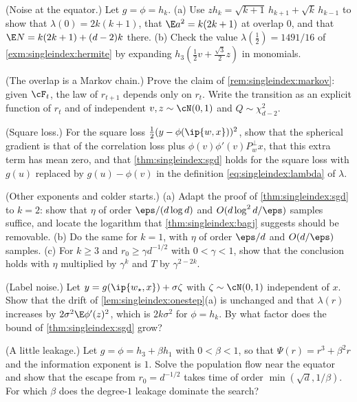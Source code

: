 \begin{refsection}
\begin{exercises}
\item \consolidation (Noise at the equator.) Let $g=\phi=h_k$. (a) Use $zh_k=\sqrt{k+1}\,h_{k+1}+\sqrt k\,h_{k-1}$ to show that $\lambda(0)=2k(k+1)$, that $\E a^2=k(2k+1)$ at overlap $0$, and that $\E N=k(2k+1)+(d-2)k$ there. (b) Check the value $\lambda(\frac12)=1491/16$ of \cref{exm:singleindex:hermite} by expanding $h_3(\frac12v+\frac{\sqrt3}2z)$ in monomials.\label{ex:singleindex:constants}

\item \consolidation (The overlap is a Markov chain.) Prove the claim of \cref{rem:singleindex:markov}: given $\cF_t$, the law of $r_{t+1}$ depends only on $r_t$. Write the transition as an explicit function of $r_t$ and of independent $v,z\sim\cN(0,1)$ and $Q\sim\chi^2_{d-2}$.\label{ex:singleindex:markov}

\item \consolidation (Square loss.) For the square loss $\frac12(y-\phi(\ip{w,x}))^2$, show that the spherical gradient is that of the correlation loss plus $\phi(v)\phi'(v)P_w^\perp x$, that this extra term has mean zero, and that \cref{thm:singleindex:sgd} holds for the square loss with $g(u)$ replaced by $g(u)-\phi(v)$ in the definition \eqref{eq:singleindex:lambda} of $\lambda$.\label{ex:singleindex:square}

\item \consolidation\hard (Other exponents and colder starts.) (a) Adapt the proof of \cref{thm:singleindex:sgd} to $k=2$: show that $\eta$ of order $\eps/(d\log d)$ and $O(d\log^2d/\eps)$ samples suffice, and locate the logarithm that \cref{thm:singleindex:bagj} suggests should be removable. (b) Do the same for $k=1$, with $\eta$ of order $\eps/d$ and $O(d/\eps)$ samples. (c) For $k\ge3$ and $r_0\ge\gamma d^{-1/2}$ with $0<\gamma<1$, show that the conclusion holds with $\eta$ multiplied by $\gamma^k$ and $T$ by $\gamma^{2-2k}$. \label{ex:singleindex:otherk}

\item \variation (Label noise.) Let $y=g(\ip{w_\star,x})+\sigma\zeta$ with $\zeta\sim\cN(0,1)$ independent of $x$. Show that the drift of \cref{lem:singleindex:onestep}(a) is unchanged and that $\lambda(r)$ increases by $2\sigma^2\E\phi'(z)^2$, which is $2k\sigma^2$ for $\phi=h_k$. By what factor does the bound of \cref{thm:singleindex:sgd} grow?\label{ex:singleindex:noise}

\item \variation (A little leakage.) Let $g=\phi=h_3+\beta h_1$ with $0<\beta<1$, so that $\Psi(r)=r^3+\beta^2r$ and the information exponent is $1$. Solve the population flow near the equator and show that the escape from $r_0=d^{-1/2}$ takes time of order $\min(\sqrt d,1/\beta)$. For which $\beta$ does the degree-$1$ leakage dominate the search?\label{ex:singleindex:leak}


\end{exercises}
\end{refsection}
